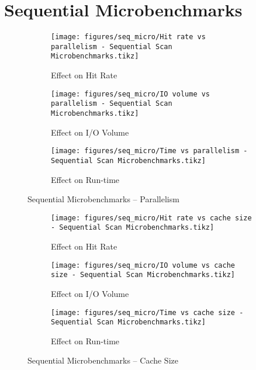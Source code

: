 \section{Sequential Microbenchmarks\label{sec:eval-seq-micro}}


\begin{figure}[p]
\centering
\begin{subfigure}{\textwidth}
    \centering
    \texttt{[image: figures/seq\_micro/Hit rate vs parallelism - Sequential Scan Microbenchmarks.tikz]}
    \caption{Effect on Hit Rate}
    \label{fig:seq_micro_parallel_hitrate}
\end{subfigure}

\begin{subfigure}{\textwidth}
    \centering
    \texttt{[image: figures/seq\_micro/IO volume vs parallelism - Sequential Scan Microbenchmarks.tikz]}
    \caption{Effect on I/O Volume}
    \label{fig:seq_micro_parallel_iovol}
\end{subfigure}

\begin{subfigure}{\textwidth}
    \centering
    \texttt{[image: figures/seq\_micro/Time vs parallelism - Sequential Scan Microbenchmarks.tikz]}
    \caption{Effect on Run-time}
    \label{fig:seq_micro_parallel_time}
\end{subfigure}

\caption{Sequential Microbenchmarks -- Parallelism}
\label{fig:seq_micro_parallelism}
\end{figure}



\begin{figure*}[t]
    \begin{subfigure}{\textwidth}
    \centering
    \texttt{[image: figures/seq\_micro/Hit rate vs cache size - Sequential Scan Microbenchmarks.tikz]}
    \caption{Effect on Hit Rate}
    \label{fig:seq_micro_shmem_hitrate}
\end{subfigure}
\begin{subfigure}{\textwidth}
    \centering
    \texttt{[image: figures/seq\_micro/IO volume vs cache size - Sequential Scan Microbenchmarks.tikz]}
    \caption{Effect on I/O Volume}
    \label{fig:seq_micro_shmem_iovol}
\end{subfigure}
\begin{subfigure}{\textwidth}
    \centering
    \texttt{[image: figures/seq\_micro/Time vs cache size - Sequential Scan Microbenchmarks.tikz]}
    \caption{Effect on Run-time}
    \label{fig:seq_micro_shmem_time}
\end{subfigure}

\caption{Sequential Microbenchmarks -- Cache Size}
\label{fig:seq_micro_shmem}
\end{figure*}



